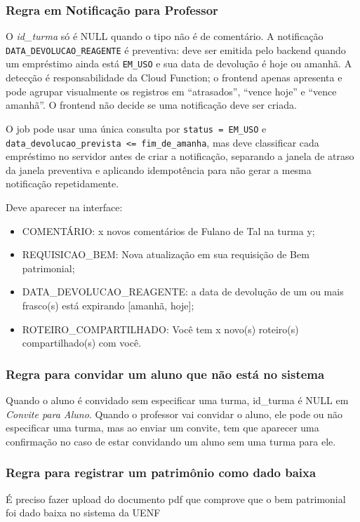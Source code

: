 \documentclass[12pt,a4paper]{article}
\begin{document}
\subsubsection{Regra em Notificação para Professor}
\begin{regra}
O \textit{id\_turma} só é NULL quando o tipo não é de comentário. A notificação \texttt{DATA\_DEVOLUCAO\_REAGENTE} é preventiva: deve ser emitida pelo backend quando um empréstimo ainda está \texttt{EM\_USO} e sua data de devolução é hoje ou amanhã. A detecção é responsabilidade da Cloud Function; o frontend apenas apresenta e pode agrupar visualmente os registros em ``atrasados'', ``vence hoje'' e ``vence amanhã''. O frontend não decide se uma notificação deve ser criada.

O job pode usar uma única consulta por \texttt{status = EM\_USO} e \texttt{data\_devolucao\_prevista <= fim\_de\_amanha}, mas deve classificar cada empréstimo no servidor antes de criar a notificação, separando a janela de atraso da janela preventiva e aplicando idempotência para não gerar a mesma notificação repetidamente.

Deve aparecer na interface:
\begin{itemize}
    \item COMENTÁRIO: x novos comentários de Fulano de Tal na turma y;
    \item REQUISICAO\_BEM: Nova atualização em sua requisição de Bem patrimonial;
    \item DATA\_DEVOLUCAO\_REAGENTE: a data de devolução de um ou mais frasco(s) está expirando [amanhã, hoje];
    \item ROTEIRO\_COMPARTILHADO: Você tem x novo(s) roteiro(s) compartilhado(s) com você.
\end{itemize}
\end{regra}

\subsubsection{Regra para convidar um aluno que não está no sistema}
\begin{regra}
Quando o aluno é convidado sem especificar uma turma, id\_turma é NULL em \textit{Convite para Aluno}. Quando o professor vai convidar o aluno, ele pode ou não especificar uma turma, mas ao enviar um convite, tem que aparecer uma confirmação no caso de estar convidando um aluno sem uma turma para ele. 
\end{regra}
\subsubsection{Regra para registrar um patrimônio como dado baixa}
\begin{regra}
É preciso fazer upload do documento pdf que comprove que o bem patrimonial foi dado baixa no sistema da UENF
\end{regra}
\end{document}
